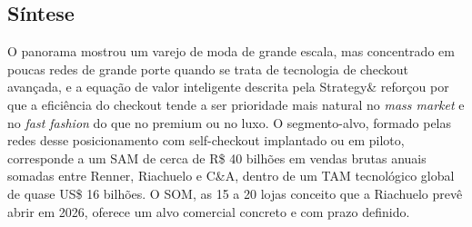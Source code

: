 \subsection{Síntese}
\label{subsec:sintese_mercado}

O panorama mostrou um varejo de moda de grande escala, mas concentrado em poucas redes de grande porte quando se trata de tecnologia de checkout avançada, e a equação de valor inteligente descrita pela Strategy\& reforçou por que a eficiência do checkout tende a ser prioridade mais natural no \textit{mass market} e no \textit{fast fashion} do que no premium ou no luxo. O segmento-alvo, formado pelas redes desse posicionamento com self-checkout implantado ou em piloto, corresponde a um SAM de cerca de R\$ 40 bilhões em vendas brutas anuais somadas entre Renner, Riachuelo e C\&A, dentro de um TAM tecnológico global de quase US\$ 16 bilhões. O SOM, as 15 a 20 lojas conceito que a Riachuelo prevê abrir em 2026, oferece um alvo comercial concreto e com prazo definido.
